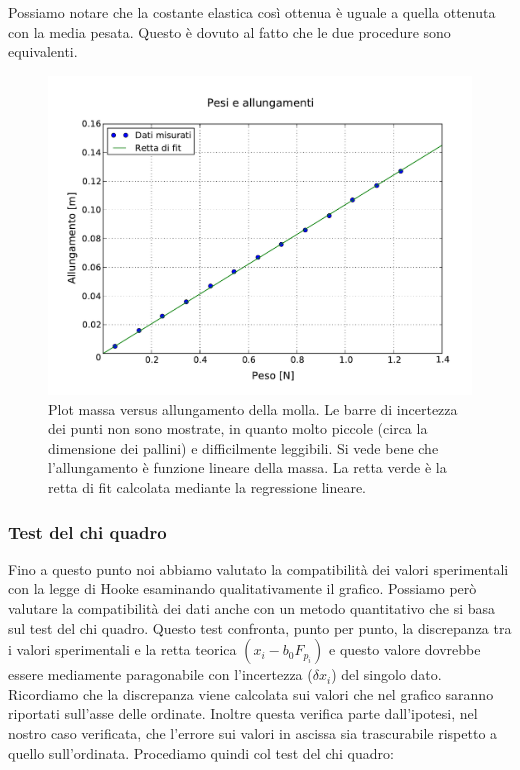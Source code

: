 Possiamo notare che la costante elastica così ottenua è uguale a quella ottenuta con la media pesata. Questo è dovuto al fatto che le due procedure sono equivalenti.

\begin{figure}
    \centering
    \includegraphics[width=120mm]{immagini/pesi_allungamenti.pdf}
    \caption{Plot massa versus allungamento della molla. Le barre di incertezza dei punti non sono mostrate,
        in quanto molto piccole (circa la dimensione dei pallini) e difficilmente leggibili. Si vede bene
        che l'allungamento è funzione lineare della massa. La retta verde è la retta di fit calcolata mediante la regressione lineare.}
    \label{fig:regressione}
\end{figure}

\subsubsection{Test del chi quadro}

Fino a questo punto noi abbiamo valutato la compatibilità dei valori sperimentali con la legge di Hooke esaminando qualitativamente il grafico. Possiamo però valutare la compatibilità dei dati anche con un metodo quantitativo che si basa sul test del chi quadro. Questo test confronta, punto per punto, la discrepanza tra i valori sperimentali e la retta teorica
$(x_i - b_0 F_{p_i})$ e questo valore dovrebbe essere mediamente paragonabile con l'incertezza ($\delta x_i$) del singolo dato. Ricordiamo che la discrepanza viene calcolata sui valori che nel grafico saranno riportati sull'asse delle ordinate. Inoltre questa verifica parte dall'ipotesi, nel nostro caso verificata, che l'errore sui valori in ascissa sia trascurabile rispetto a quello sull'ordinata.
Procediamo quindi col test del chi quadro:

